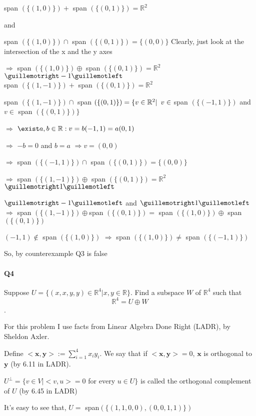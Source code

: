\documentclass{article}
\begin{document}
span $(\{(1,0)\}) +$ span $(\{(0,1)\}) = \mathbb{R}^2$

and

span $(\{(1,0)\}) \cap$ span $(\{(0,1)\}) = \{(0,0)\}$ Clearly, just
look at the intersection of the x and the y axes

$\Rightarrow$ span $(\{(1,0)\}) \oplus$ span $(\{(0,1)\}) =
\mathbb{R}^2$ $\guillemotright -1 \guillemotleft$\\

span $(\{(1,-1)\}) +$ span $(\{(0,1)\}) = \mathbb{R}^2$

span $(\{(1,-1)\}) \cap$ span $(\{(0,1)\}) = \{ v \in \mathbb{R}^2
|\enskip v \in$ span $(\{(-1,1)\})$ and $v \in$ span $(\{(0,1)\})\}$

$\Rightarrow$ $\exist a,b\in \mathbb{R}: v = b(-1,1) = a(0,1)$

$\Rightarrow$ $-b=0$ and $b = a$ $\Rightarrow v = (0,0)$

$\Rightarrow$ span $(\{(-1,1)\}) \cap$ span $(\{(0,1)\}) = \{(0,0)\}$

$\Rightarrow$ span $(\{(1,-1)\}) \oplus$ span $(\{(0,1)\}) = \mathbb{R}^2$ $\guillemotright 1 \guillemotleft$

$\guillemotright -1 \guillemotleft$ and $\guillemotright 1
\guillemotleft$ $\Rightarrow$ span $(\{(1,-1)\}) \oplus $span
$(\{(0,1)\}) =$ span $(\{(1,0)\}) \oplus$ span $(\{(0,1)\})$

$(-1,1) \notin$ span $(\{(1,0)\})$ $\Rightarrow$ span $(\{(1,0)\})
\neq$ span $(\{(-1,1)\})$

So, by counterexample Q3 is false

\newpage
\paragraph{Q4} Suppose $U = \{(x, x, y, y) ∈ \mathbb{R}^4 | x, y ∈ \mathbb{R}\}$. Find a subspace $W$ of $\mathbb{R}^4$ such that
\[\mathbb{R}^4 = U ⊕ W\].


For this problem I use facts from Linear Algebra Done Right (LADR), by
Sheldon Axler.

Define $<\mathbf{x},\mathbf{y}> := \sum_{i=1}^4x_iy_i$.
We say that if $<\mathbf{x},\mathbf{y}> = 0$, $\mathbf{x}$ is orthogonal to
$\mathbf{y}$ (by 6.11 in LADR).

$U^\perp = \{v\in V| < v, u> = 0$ for every $u \in U\}$ is called the
orthogonal complement of $U$ (by 6.45 in
LADR)

It's easy to see that, $U =$ span$(\{(1,1,0,0),(0,0,1,1)\})$
\end{document}
